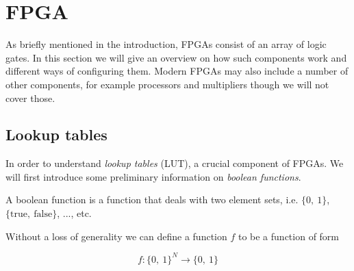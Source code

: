 \chapter{FPGA\label{FPGA}}
As briefly mentioned in the introduction, FPGAs consist of an array of logic
gates. In this section we will give an overview on how such components work
and different ways of configuring them. Modern FPGAs may also include a number
of other components, for example processors and multipliers though we will not
cover those.

\section{Lookup tables}

In order to understand \textit{lookup tables} (LUT), a crucial component of
FPGAs. We will first introduce some preliminary information on \textit{boolean
functions}.

\begin{definition}
    A boolean function is a function that deals with two element sets, i.e.
    $\{0,\ 1\}$, $\{\text{true},\ \text{false}\}$, ..., etc.

    Without a loss of generality we can define a function $f$ to be a function
    of form

    \[f \colon \{0,\ 1\}^N \rightarrow \{0,\ 1\}\]

\end{definition}

